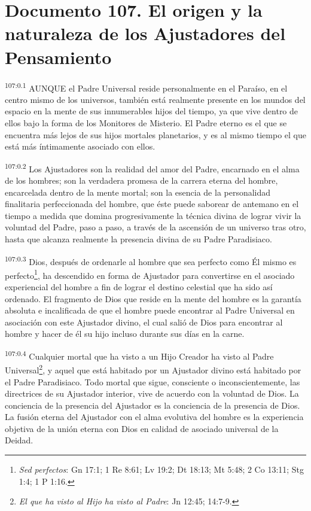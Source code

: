 \chapter{Documento 107. El origen y la naturaleza de los Ajustadores del Pensamiento}
\par
\textsuperscript{107:0.1} AUNQUE el Padre Universal reside personalmente en el Paraíso, en el centro mismo de los universos, también está realmente presente en los mundos del espacio en la mente de sus innumerables hijos del tiempo, ya que vive dentro de ellos bajo la forma de los Monitores de Misterio. El Padre eterno es el que se encuentra más lejos de sus hijos mortales planetarios, y es al mismo tiempo el que está más íntimamente asociado con ellos.

\par
\textsuperscript{107:0.2} Los Ajustadores son la realidad del amor del Padre, encarnado en el alma de los hombres; son la verdadera promesa de la carrera eterna del hombre, encarcelada dentro de la mente mortal; son la esencia de la personalidad finalitaria perfeccionada del hombre, que éste puede saborear de antemano en el tiempo a medida que domina progresivamente la técnica divina de lograr vivir la voluntad del Padre, paso a paso, a través de la ascensión de un universo tras otro, hasta que alcanza realmente la presencia divina de su Padre Paradisiaco.

\par
\textsuperscript{107:0.3} Dios, después de ordenarle al hombre que sea perfecto como Él mismo es perfecto\footnote{\textit{Sed perfectos}: Gn 17:1; 1 Re 8:61; Lv 19:2; Dt 18:13; Mt 5:48; 2 Co 13:11; Stg 1:4; 1 P 1:16.}, ha descendido en forma de Ajustador para convertirse en el asociado experiencial del hombre a fin de lograr el destino celestial que ha sido así ordenado. El fragmento de Dios que reside en la mente del hombre es la garantía absoluta e incalificada de que el hombre puede encontrar al Padre Universal en asociación con este Ajustador divino, el cual salió de Dios para encontrar al hombre y hacer de él su hijo incluso durante sus días en la carne.

\par
\textsuperscript{107:0.4} Cualquier mortal que ha visto a un Hijo Creador ha visto al Padre Universal\footnote{\textit{El que ha visto al Hijo ha visto al Padre}: Jn 12:45; 14:7-9.}, y aquel que está habitado por un Ajustador divino está habitado por el Padre Paradisiaco. Todo mortal que sigue, consciente o inconscientemente, las directrices de su Ajustador interior, vive de acuerdo con la voluntad de Dios. La conciencia de la presencia del Ajustador es la conciencia de la presencia de Dios. La fusión eterna del Ajustador con el alma evolutiva del hombre es la experiencia objetiva de la unión eterna con Dios en calidad de asociado universal de la Deidad.

